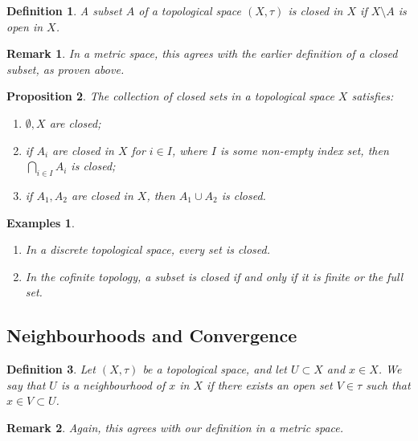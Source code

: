 \documentclass{article}
\theoremstyle{plain}\theoremheaderfont{\normalfont\itshape}\theorembodyfont{\rmfamily}\theoremseparator{.}\newtheorem*{rem}{Remark}\newtheorem*{ex}{Example}\newtheorem*{proof}{Proof}\newtheorem*{altp}{Alternative proof}
\theoremstyle{plain}\theoremheaderfont{\normalfont\bfseries}\theorembodyfont{\rmfamily}\theoremseparator{.}\newtheorem{thm}{Theorem}[section]\newtheorem{lem}[thm]{Lemma}\newtheorem{prop}[thm]{Proposition}\newtheorem*{cor}{Corollary}\newtheorem{defn}[thm]{Definition}\newtheorem{clm}[thm]{Claim}\newtheorem{clminproof}{Claim}
\theoremstyle{break}\theoremheaderfont{\normalfont\itshape}\theorembodyfont{\rmfamily}\theoremseparator{.\medskip}\newtheorem*{proofskip}{Proof}\newtheorem*{exs}{Examples}\newtheorem*{rems}{Remarks}
\theoremstyle{break}\theoremheaderfont{\normalfont\bfseries}\theorembodyfont{\rmfamily}\theoremseparator{.\medskip}\newtheorem{lemskip}[thm]{Lemma}\newtheorem{defnskip}[thm]{Definition}\newtheorem{propskip}[thm]{Proposition}\newtheorem{thmskip}[thm]{Theorem}
\begin{document}
    \begin{defn}
        A subset \(A\) of a topological space \((X,\tau)\) is \textit{closed} in \(X\) if \(X\setminus A\) is open in \(X\).
    \end{defn}
    \begin{rem}
        In a metric space, this agrees with the earlier definition of a closed subset, as proven above.
    \end{rem}

    \begin{prop}
        The collection of closed sets in a topological space \(X\) satisfies:
        \begin{enumerate}[label=(\roman*),topsep=0pt]
            \item \(\emptyset, X\) are closed;
            \item if \(A_i\) are closed in \(X\) for \(i\in I\), where \(I\) is some non-empty index set, then \(\bigcap_{i\in I}A_i\) is closed;
            \item if \(A_1,A_2\) are closed in \(X\), then \(A_1\cup A_2\) is closed.
        \end{enumerate}
    \end{prop}
    
    \begin{exs}
        \begin{enumerate}[label=(\roman*),topsep=0pt]
            \item In a discrete topological space, every set is closed.
            \item In the cofinite topology, a subset is closed if and only if it is finite or the full set.
        \end{enumerate}
    \end{exs}

    \subsection{Neighbourhoods and Convergence}
    \begin{defn}
        Let \((X,\tau)\) be a topological space, and let \(U\subset X\) and \(x\in X\). We say that \(U\) is a \textit{neighbourhood} of \(x\) in \(X\) if there exists an open set \(V\in\tau\) such that \(x\in V\subset U\). 
    \end{defn}
    \begin{rem}
        Again, this agrees with our definition in a metric space.
    \end{rem}
\end{document}
